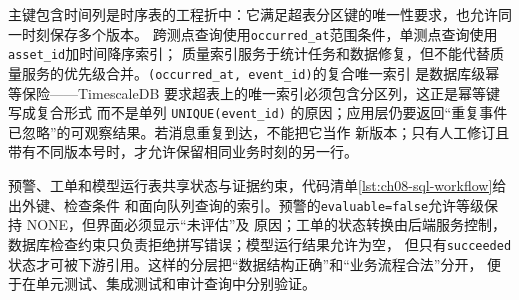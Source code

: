 主键包含时间列是时序表的工程折中：它满足超表分区键的唯一性要求，也允许同一时刻保存多个版本。
跨测点查询使用\texttt{occurred\_at}范围条件，单测点查询使用\texttt{asset\_id}加时间降序索引；
质量索引服务于统计任务和数据修复，但不能代替质量服务的优先级合并。\texttt{(occurred\_at, event\_id)}的复合唯一索引
是数据库级幂等保险——TimescaleDB 要求超表上的唯一索引必须包含分区列，这正是幂等键写成复合形式
而不是单列 \texttt{UNIQUE(event\_id)} 的原因；应用层仍要返回“重复事件已忽略”的可观察结果。若消息重复到达，不能把它当作
新版本；只有人工修订且带有不同版本号时，才允许保留相同业务时刻的另一行。

预警、工单和模型运行表共享状态与证据约束，代码清单\ref{lst:ch08-sql-workflow}给出外键、检查条件
和面向队列查询的索引。预警的\texttt{evaluable=false}允许等级保持 NONE，但界面必须显示“未评估”及
原因；工单的状态转换由后端服务控制，数据库检查约束只负责拒绝拼写错误；模型运行结果允许为空，
但只有\texttt{succeeded}状态才可被下游引用。这样的分层把“数据结构正确”和“业务流程合法”分开，
便于在单元测试、集成测试和审计查询中分别验证。

